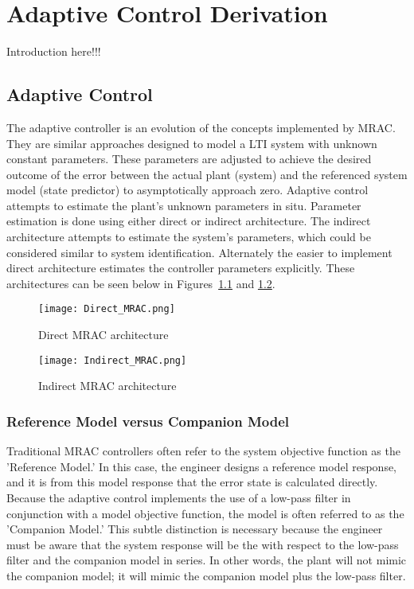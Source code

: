 \chapter{\Lone Adaptive Control Derivation}\label{ch:derivation}

Introduction here!!!

\section{\Lone Adaptive Control}
The \Lone adaptive controller is an evolution of the concepts implemented by \ac{MRAC}.  They are similar approaches designed to model a \ac{LTI} system with unknown constant parameters.  These parameters are adjusted to achieve the desired outcome of the error between the actual plant (system) and the referenced system model (state predictor) to asymptotically approach zero.   Adaptive control attempts to estimate the plant's unknown parameters in situ.  Parameter estimation is done using either direct or indirect architecture.  The indirect architecture attempts to estimate the system's parameters, which could be considered similar to system identification.  Alternately the easier to implement direct architecture estimates the controller parameters explicitly.  These architectures can be seen below in Figures~\ref{fig:direct_mrac} and \ref{fig:indirect_mrac}.

\begin{figure}[h!]
 \centering
  \texttt{[image: Direct\_MRAC.png]}
  \caption{Direct \ac{MRAC} architecture }
  \label{fig:direct_mrac}
\end{figure}

\begin{figure}[h!]
 \centering
  \texttt{[image: Indirect\_MRAC.png]}
  \caption{Indirect \ac{MRAC} architecture }
  \label{fig:indirect_mrac}
\end{figure}

\subsection{Reference Model versus Companion Model}
Traditional \ac{MRAC} controllers often refer to the system objective function as the 'Reference Model.'  In this case, the engineer designs a reference model response, and it is from this model response that the error state is calculated directly.  Because the \Lone adaptive control implements the use of a low-pass filter in conjunction with a model objective function, the model is often referred to as the 'Companion Model.'  This subtle distinction is necessary because the engineer must be aware that the system response will be the with respect to the low-pass filter and the companion model in series.  In other words, the plant will not mimic the companion model; it will mimic the companion model plus the low-pass filter.

